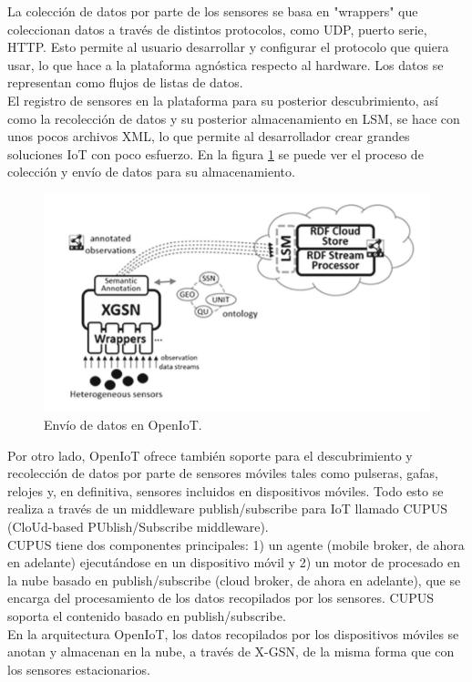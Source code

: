 \documentclass[12pt, twoside]{book}
\begin{document}
La colección de datos por parte de los sensores se basa en "wrappers" que coleccionan datos a través de distintos protocolos, como UDP, puerto serie, HTTP. Esto permite al usuario desarrollar y configurar el protocolo que quiera usar, lo que hace a la plataforma agnóstica respecto al hardware. Los datos se representan como flujos de listas de datos.\\
El registro de sensores en la plataforma para su posterior descubrimiento, así como la recolección de datos y su posterior almacenamiento en LSM, se hace con unos pocos archivos XML, lo que permite al desarrollador crear grandes soluciones IoT con poco esfuerzo. En la figura \ref{wrappers} se puede ver el proceso de colección y envío de datos para su almacenamiento.\\
\begin{figure}[H]
\centering
\includegraphics[scale=0.6]{images/wrappers_openiot}
\caption{Envío de datos en OpenIoT.}\label{wrappers}
\end{figure}
Por otro lado, OpenIoT ofrece también soporte para el descubrimiento y recolección de datos por parte de sensores móviles tales como pulseras, gafas, relojes y, en definitiva, sensores incluidos en dispositivos móviles. Todo esto se realiza a través de un middleware publish/subscribe para IoT llamado CUPUS (CloUd-based PUblish/Subscribe middleware). \\
CUPUS tiene dos componentes principales: 1) un agente (mobile broker, de ahora en adelante) ejecutándose en un dispositivo móvil y 2) un motor de procesado en la nube basado en publish/subscribe (cloud broker, de ahora en adelante), que se encarga del procesamiento de los datos recopilados por los sensores. CUPUS soporta el contenido basado en publish/subscribe.\\
En la arquitectura OpenIoT, los datos recopilados por los dispositivos móviles se anotan y almacenan en la nube, a través de X-GSN, de la misma forma que con los sensores estacionarios. \\
\end{document}
